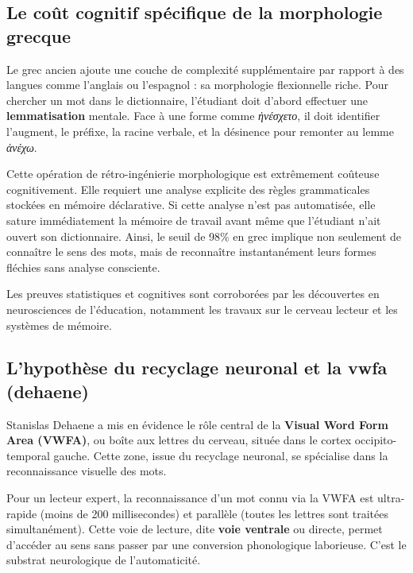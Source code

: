 {\subsection{Le coût cognitif spécifique de la morphologie grecque}

Le grec ancien ajoute une couche de complexité supplémentaire par rapport à des langues comme
l'anglais ou l'espagnol : sa morphologie flexionnelle riche. Pour chercher un mot dans le
dictionnaire, l'étudiant doit d'abord effectuer une \textbf{lemmatisation} mentale. Face à une forme
comme \textit{ἠνέσχετο}, il doit identifier l'augment, le préfixe, la racine verbale, et la
désinence pour remonter au lemme \textit{ἀνέχω}.

Cette opération de \og rétro-ingénierie\fg{} morphologique est extrêmement coûteuse cognitivement.
Elle requiert une analyse explicite des règles grammaticales stockées en mémoire déclarative. Si
cette analyse n'est pas automatisée, elle sature immédiatement la mémoire de travail avant même que
l'étudiant n'ait ouvert son dictionnaire.\cite{II-3-2-ref28} Ainsi, le seuil de 98\% en grec
implique non seulement de connaître le sens des mots, mais de reconnaître instantanément leurs
formes fléchies sans analyse consciente.

Les preuves statistiques et cognitives sont corroborées par les découvertes en neurosciences de
l'éducation, notamment les travaux sur le \og cerveau lecteur\fg{} et les systèmes de mémoire.



\subsection{L'hypothèse du recyclage neuronal et la vwfa (dehaene)}

Stanislas Dehaene a mis en évidence le rôle central de la \textbf{Visual Word Form Area (VWFA)}, ou
\og boîte aux lettres du cerveau\fg{}, située dans le cortex occipito-temporal gauche. Cette zone,
issue du recyclage neuronal, se spécialise dans la reconnaissance visuelle des
mots.\cite{II-3-2-ref30}

Pour un lecteur expert, la reconnaissance d'un mot connu via la VWFA est ultra-rapide (moins de 200
millisecondes) et parallèle (toutes les lettres sont traitées simultanément). Cette voie de lecture,
dite \textbf{voie ventrale} ou directe, permet d'accéder au sens sans passer par une conversion
phonologique laborieuse. C'est le substrat neurologique de l'automaticité.\cite{II-3-2-ref32}

}
